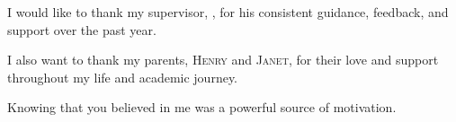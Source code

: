 \documentclass[
11pt, %
english, %
singlespacing, %
parskip, %
headsepline, %
chapterinoneline, %
oneside
]{MastersDoctoralThesis} %
\begin{document}
\begin{acknowledgements}
\addchaptertocentry{\acknowledgementname} %


\vspace{20pt}
I would like to thank my supervisor, \supname, for his consistent guidance, feedback, and support over the past year.
\vspace{10pt}

I also want to thank my parents, \textsc{Henry} and \textsc{Janet}, for their love and support throughout my life and academic journey.

\vspace{10pt}

Knowing that you believed in me was a powerful source of motivation.
\vspace*{\fill}
\end{acknowledgements}



\tableofcontents %

\listoffigures %

\listoftables %

\end{document}

